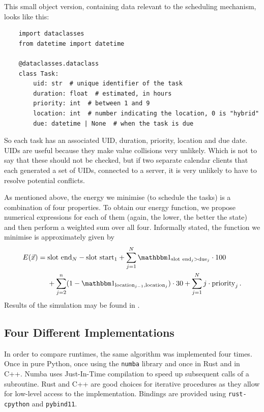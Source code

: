\documentclass{prettytex/ox/mmsc-special-topic}
\begin{document}
  This small object version, containing data relevant to the scheduling mechanism, looks like this:
  \begin{verbatim}
    import dataclasses
    from datetime import datetime

    @dataclasses.dataclass
    class Task:
        uid: str  # unique identifier of the task
        duration: float  # estimated, in hours
        priority: int  # between 1 and 9
        location: int  # number indicating the location, 0 is "hybrid"
        due: datetime | None  # when the task is due
  \end{verbatim}

  So each task has an associated UID, duration, priority, location and due date.
  UIDs are useful because they make value collisions very unlikely.
  Which is not to say that these should not be checked, but if two separate calendar clients that each generated a set of UIDs, connected to a server, it is very unlikely to have to resolve potential conflicts.

  As mentioned above, the energy we minimise (to schedule the tasks) is a combination of four properties.
  To obtain our energy function, we propose numerical expressions for each of them (again, the lower, the better the state) and then perform a weighted sum over all four.
  Informally stated, the function we minimise is approximately given by
  \begin{align}
    \label{eq:energy} E(\vec{x}) = \; & \mathrm{slot~end}_N - \mathrm{slot~start}_1 + \sum_{j=1}^{N} \identity_{\mathrm{slot~end}_j > \mathrm{due}_j} \cdot 100                    \\
    \nonumber                         & + \sum_{j=2}^{n} (1 - \identity_{\mathrm{location}_{j-1}, \mathrm{location}_{j}}) \cdot 30 + \sum_{j=1}^{N} j \cdot \mathrm{priority}_j\,.
  \end{align}
  Results of the simulation may be found in .

  \subsection{Four Different Implementations}
  In order to compare runtimes, the same algorithm was implemented four times.
  Once in pure Python, once using the \texttt{numba} library and once in Rust and in C++.
  Numba uses Just-In-Time compilation to speed up subsequent calls of a subroutine.
  Rust and C++ are good choices for iterative procedures as they allow for low-level access to the implementation. Bindings are provided using \texttt{rust-cpython} and \texttt{pybind11}.
\end{document}
